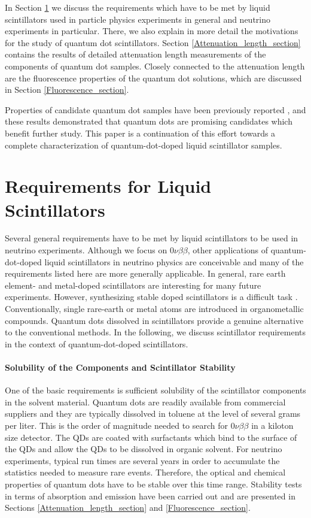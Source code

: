 \documentclass[cits]{JINST}
\begin{document}
In Section \ref{Requirements_section} we discuss the requirements which have to be met by liquid scintillators used in particle physics experiments in general and neutrino experiments in particular. There, we also explain in more detail the motivations for the study of quantum dot scintillators. Section \ref{Attenuation_length_section} contains the results of detailed attenuation length measurements of the components of quantum dot samples. Closely connected to the attenuation length are the fluorescence properties of the quantum dot solutions, which are discussed in Section \ref{Fluorescence_section}. 

Properties of candidate quantum dot samples have been previously reported \cite{mitpaper}, and these results demonstrated that quantum dots are promising candidates which benefit further study. This paper is a continuation of this effort towards a complete characterization of quantum-dot-doped liquid scintillator samples. 


\section{Requirements for Liquid Scintillators}\label{Requirements_section}
Several general requirements have to be met by liquid scintillators to be used in neutrino experiments. Although we focus on 0$\nu\beta\beta$, other applications of quantum-dot-doped liquid scintillators in neutrino physics are conceivable \cite{mitpaper} and many of the requirements listed here are more generally applicable. In general, rare earth element- and metal-doped scintillators are interesting for many future experiments. However, synthesizing stable doped scintillators is a difficult task \cite{gd_mpik,chooz,piepke}. Conventionally, single rare-earth or metal atoms are introduced in organometallic compounds. Quantum dots dissolved in scintillators provide a genuine alternative to the conventional methods. In the following, we discuss scintillator requirements in the context of quantum-dot-doped scintillators.  

\paragraph{Solubility of the Components and Scintillator Stability}
One of the basic requirements is sufficient solubility of the scintillator components in the solvent material. Quantum dots are readily available from commercial suppliers and they are typically dissolved in toluene at the level of several grams per liter. This is the order of magnitude needed to search for 0$\nu\beta\beta$ in a kiloton size detector. The QDs are coated with surfactants which bind to the surface of the QDs and allow the QDs to be dissolved in organic solvent. For neutrino experiments, typical run times are several years in order to accumulate the statistics needed to measure rare events. Therefore, the optical and chemical properties of quantum dots have to be stable over this time range. Stability tests in terms of absorption and emission have been carried out and are presented in Sections \ref{Attenuation_length_section} and \ref{Fluorescence_section}.
\end{document}
